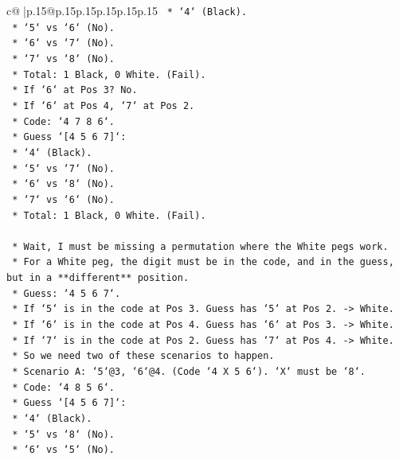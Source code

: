\documentclass{article}
\begin{document}
{\begin{supertabular}{c@{$\;$}|p{.15\linewidth}@{}p{.15\linewidth}p{.15\linewidth}p{.15\linewidth}p{.15\linewidth}p{.15\linewidth}}
{{{\texttt{            *   `4` (Black).} \\
\texttt{            *   `5` vs `6` (No).} \\
\texttt{            *   `6` vs `7` (No).} \\
\texttt{            *   `7` vs `8` (No).} \\
\texttt{            *   Total: 1 Black, 0 White. (Fail).} \\
\texttt{        *   If `6` at Pos 3? No.} \\
\texttt{        *   If `6` at Pos 4, `7` at Pos 2.} \\
\texttt{        *   Code: `4 7 8 6`.} \\
\texttt{        *   Guess `{[}4 5 6 7{]}`:} \\
\texttt{            *   `4` (Black).} \\
\texttt{            *   `5` vs `7` (No).} \\
\texttt{            *   `6` vs `8` (No).} \\
\texttt{            *   `7` vs `6` (No).} \\
\texttt{            *   Total: 1 Black, 0 White. (Fail).} \\
\\ 
\texttt{    *   Wait, I must be missing a permutation where the White pegs work.} \\
\texttt{    *   For a White peg, the digit must be in the code, and in the guess, but in a **different** position.} \\
\texttt{    *   Guess: `4 5 6 7`.} \\
\texttt{    *   If `5` is in the code at Pos 3. Guess has `5` at Pos 2. {-}> White.} \\
\texttt{    *   If `6` is in the code at Pos 4. Guess has `6` at Pos 3. {-}> White.} \\
\texttt{    *   If `7` is in the code at Pos 2. Guess has `7` at Pos 4. {-}> White.} \\
\texttt{    *   So we need two of these scenarios to happen.} \\
\texttt{    *   Scenario A: `5`@3, `6`@4. (Code `4 X 5 6`). `X` must be `8`.} \\
\texttt{        *   Code: `4 8 5 6`.} \\
\texttt{        *   Guess `{[}4 5 6 7{]}`:} \\
\texttt{            *   `4` (Black).} \\
\texttt{            *   `5` vs `8` (No).} \\
\texttt{            *   `6` vs `5` (No).} \\
}}}
\end{supertabular}}
\end{document}
